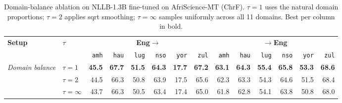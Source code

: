 \begin{table}[t]
\centering
\small
\renewcommand{\arraystretch}{1.05}
\begin{tabular}{llrrrrrrrrrrrr}
\toprule
\textbf{Setup} & \textbf{$\tau$} & \multicolumn{6}{c}{\textbf{Eng$\to$}} & \multicolumn{6}{c}{\textbf{$\to$Eng}} \\
\cmidrule(lr){3-8}\cmidrule(lr){9-14}
  &   & \texttt{amh} & \texttt{hau} & \texttt{lug} & \texttt{nso} & \texttt{yor} & \texttt{zul} & \texttt{amh} & \texttt{hau} & \texttt{lug} & \texttt{nso} & \texttt{yor} & \texttt{zul} \\
\midrule
\multirow{3}{*}{\textit{Domain balance}} & $\tau{=}1$ & \textbf{45.5} & \textbf{67.7} & \textbf{51.5} & \textbf{64.3} & \textbf{17.7} & \textbf{67.2} & \textbf{63.1} & \textbf{64.3} & \textbf{55.4} & \textbf{65.8} & \textbf{53.3} & \textbf{68.6} \\
 & $\tau{=}2$ & 44.5 & 66.3 & 50.8 & 63.9 & 17.5 & 65.6 & 62.3 & 63.3 & 54.3 & 64.6 & 51.5 & 68.4 \\
 & $\tau{=}\infty$ & 43.7 & 66.3 & 50.5 & 63.4 & 17.4 & 65.0 & 61.8 & 62.8 & 54.1 & 63.8 & 50.8 & 68.0 \\
\bottomrule
\end{tabular}
\caption{Domain-balance ablation on NLLB-1.3B fine-tuned on AfriScience-MT (ChrF). $\tau{=}1$ uses the natural domain proportions; $\tau{=}2$ applies sqrt smoothing; $\tau{=}\infty$ samples uniformly across all 11 domains. Best per column in bold.}
\label{tab:balance_chrf}
\end{table}
